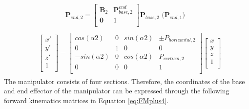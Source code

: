 \begin{align}
    &\qquad\qquad
    \begin{aligned}
    \textbf{P}_{end,2}
    =
    \begin{bmatrix}
        \textbf{B}_2 & \textbf{P}_{base,2}^{end} \\
        \textbf{0} & 1 \\
    \end{bmatrix}
    \textbf{P}_{base,2}
    \text{ ($\textbf{P}_{end,1}$)}
    \end{aligned}\label{eq:CTMS2}\\
    &\begin{aligned}
    \begin{bmatrix}
        x' \\
        y' \\
        z' \\
        1  \\
    \end{bmatrix}
    =
    \begin{bmatrix}
        cos(\alpha2) & 0 & sin(\alpha2) & \pm P_{horizontal,2} \\
        0 & 1 & 0 & 0 \\
        -sin(\alpha2) & 0 & cos(\alpha2) & P_{vertical,2} \\
        0 & 0 & 0 & 1 \\
    \end{bmatrix}
    \begin{bmatrix}
        x \\
        y \\
        z \\
        1 \\
    \end{bmatrix}
    \end{aligned}
    \label{eq:composite_transf_matrix_section2}
\end{align}
The manipulator consists of four sections. Therefore, the coordinates of the base and end effector of the manipulator can 
be expressed through the following forward kinematics matrices in Equation \ref{eq:FMplus4}.
